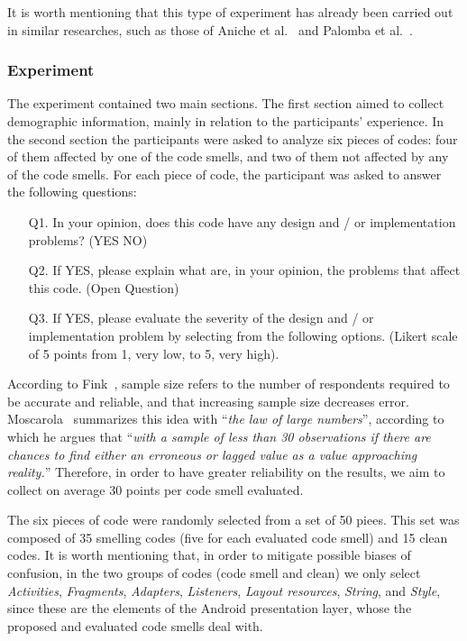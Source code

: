 It is worth mentioning that this type of experiment has already been carried out in similar researches, such as those of Aniche et al.~\cite{AnicheSmellsMVC:17, MvcSmells:16} and Palomba et al.~\cite{Palomba_Do_2014}.

\subsubsection{Experiment}
\label{etapa-3-experimento}

The experiment contained two main sections. The first section aimed to collect demographic information, mainly in relation to the participants' experience. In the second section the participants were asked to analyze six pieces of codes: four of them affected by one of the code smells, and two of them not affected by any of the code smells. For each piece of code, the participant was asked to answer the following questions:

\begin{itemize}

    \item[Q1.] 
    In your opinion, does this code have any design and / or implementation problems? (YES NO)

    \item[Q2.] If YES, please explain what are, in your opinion, the problems that affect this code. (Open Question)

    \item[Q3.] If YES, please evaluate the severity of the design and / or implementation problem by selecting from the following options. (Likert scale of 5 points from 1, very low, to 5, very high).

\end{itemize}


According to Fink~\cite{Fink:95}, sample size refers to the number of respondents required to be accurate and reliable, and that increasing sample size decreases error. Moscarola~\cite{Moscarola:90} summarizes this idea with ``\textit{the law of large numbers}'', according to which he argues that ``\textit{with a sample of less than 30 observations if there are chances to find either an erroneous or lagged value as a value approaching reality.}'' Therefore, in order to have greater reliability on the results, we aim to collect on average 30 points per code smell evaluated.


The six pieces of code were randomly selected from a set of 50 piees. This set was composed of 35 smelling codes (five for each evaluated code smell) and 15 clean codes. It is worth mentioning that, in order to mitigate possible biases of confusion, in the two groups of codes (code smell and clean) we only select \textit{Activities}, \textit{Fragments}, \textit{Adapters}, \textit{Listeners}, \textit{Layout resources}, \textit{String}, and \textit{Style}, since these are the elements of the Android presentation layer, whose the proposed and evaluated code smells deal with.

